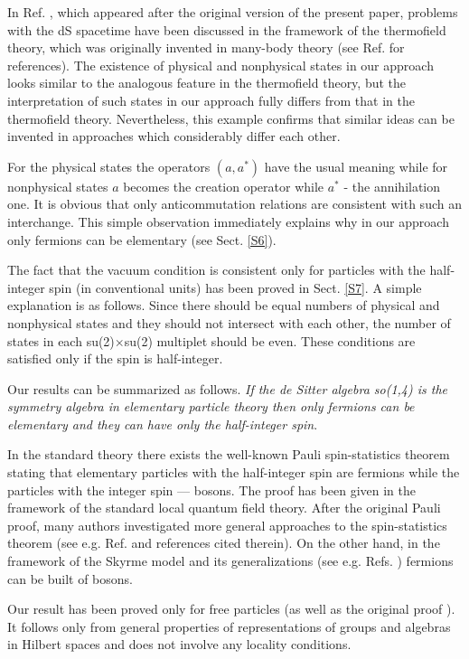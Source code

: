 \documentclass[a4paper,12pt]{article}%
\begin{document}
In Ref. \cite{Susskind}, which appeared after the
original version of the present paper, problems with
the dS spacetime have been discussed in the framework of
the thermofield theory, which was originally invented
in many-body theory (see Ref. \cite{Susskind} for
references). The existence of physical and nonphysical
states in our approach looks similar to the analogous 
feature in the thermofield theory, but the
interpretation of such states in our approach fully
differs from that in the thermofield theory.
Nevertheless, this example confirms that similar 
ideas can be invented in approaches which considerably
differ each other.  

For the physical states the 
operators $(a,a^*)$ have the usual meaning while for 
nonphysical states $a$ becomes the creation operator while 
$a^*$ - the annihilation one. It is obvious that only
anticommutation relations are consistent with such an 
interchange. This simple observation immediately explains why 
in our approach only fermions can 
be elementary (see Sect. \ref{S6}). 

The fact that the vacuum condition is consistent only for 
particles with the half-integer spin (in conventional units) 
has been proved in Sect. \ref{S7}. A simple explanation is 
as follows. Since there should be equal numbers of physical 
and nonphysical states and they should not intersect with 
each other, the number of states in each su(2)$\times$su(2) 
multiplet should be even. These conditions are satisfied 
only if the spin is half-integer.

Our results can be summarized as follows. {\it If the de 
Sitter algebra so(1,4) is the symmetry algebra in elementary 
particle theory then only fermions can be elementary and 
they can have only the half-integer spin}.

In the standard theory there exists the well-known Pauli 
spin-statistics theorem \cite{Pauli} stating that 
elementary particles with the half-integer spin are 
fermions while the particles with the integer spin --- 
bosons. The proof has been given in the framework of the 
standard local quantum field theory. After the original 
Pauli proof, many authors investigated more general 
approaches to the spin-statistics theorem (see e.g. Ref. 
\cite{Kuckert} and references cited therein). On the 
other hand, in the framework of the Skyrme model 
\cite{Skyrme} and its generalizations (see e.g. 
Refs. \cite{Zahed}) fermions can be built of bosons.

Our result has been proved only for free particles (as well
as the original proof \cite{Pauli}). It follows only from 
general properties of representations of groups and algebras
in Hilbert spaces and does not involve any locality
conditions.
\end{document}
